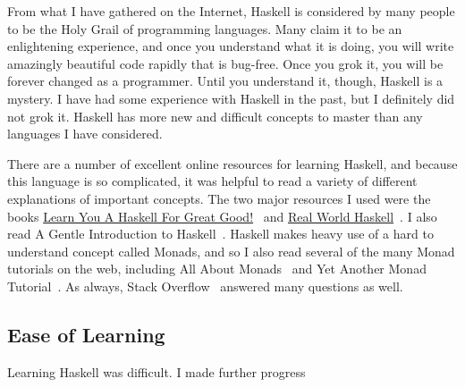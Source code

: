 \documentclass{article}
\begin{document}
From what I have gathered on the Internet, Haskell is considered by many people
to be the Holy Grail of programming languages.  Many claim it to be an
enlightening experience, and once you understand what it is doing, you will
write amazingly beautiful code rapidly that is bug-free.  Once you grok it, you
will be forever changed as a programmer.  Until you understand it, though,
Haskell is a mystery.  I have had some experience with Haskell in the past, but
I definitely did not grok it.  Haskell has more new and difficult concepts to
master than any languages I have considered.

There are a number of excellent online resources for learning Haskell, and
because this language is so complicated, it was helpful to read a variety of
different explanations of important concepts.  The two major resources I used
were the books \underline{Learn You A Haskell For Great
Good!}~\cite{learnyouahaskell} and \underline{Real World
Haskell}~\cite{realworldhaskell}.  I also read A Gentle Introduction to
Haskell~\cite{gentleintroduction}.  Haskell makes heavy use of a hard to
understand concept called Monads, and so I also read several of the many Monad
tutorials on the web, including All About Monads~\cite{allaboutmonads} and Yet
Another Monad Tutorial~\cite{yamt}.  As always, Stack
Overflow~\cite{stackoverflow} answered many questions as well.

\subsection{Ease of Learning}

Learning Haskell was difficult.  I made further progress
\end{document}
